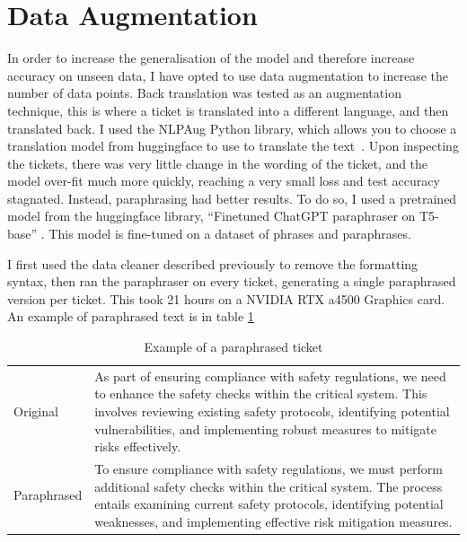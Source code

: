 \documentclass{UoYCSproject}
\begin{document}
    \section{Data Augmentation}\label{sec:data-augmentation}
    In order to increase the generalisation of the model and therefore increase accuracy on unseen data, I have opted to use data augmentation to increase the number of data points.
    Back translation was tested as an augmentation technique, this is where a ticket is translated into a different language, and then translated back.
    I used the NLPAug Python library, which allows you to choose a translation model from huggingface to use to translate the text~\cite{ma2019nlpaug}.
    Upon inspecting the tickets, there was very little change in the wording of the ticket, and the model over-fit much more quickly, reaching a very small loss and test accuracy stagnated.
    Instead, paraphrasing had better results.
    To do so, I used a pretrained model from the huggingface library, ``Finetuned ChatGPT paraphraser on T5-base'' \cite{chatgpt_paraphraser}.
    This model is fine-tuned on a dataset of phrases and paraphrases.


    I first used the data cleaner described previously to remove the formatting syntax, then ran the paraphraser on every ticket, generating a single paraphrased version per ticket.
    This took 21 hours on a NVIDIA RTX a4500 Graphics card. An example of paraphrased text is in table \ref{tab:paraphrased} \par
    \begin{table}
    \centering
    \begin{tabular}{p{2.5cm}p{9cm}}
    \toprule
    Original    & As part of ensuring compliance with safety regulations, we need to enhance the safety checks within the critical system.
    This involves reviewing existing safety protocols, identifying potential vulnerabilities, and implementing robust measures to mitigate risks effectively. \\\addlinespace[0.5em]
    Paraphrased & To ensure compliance with safety regulations, we must perform additional safety checks within the critical system. The process entails examining current safety protocols, identifying potential weaknesses, and implementing effective risk mitigation measures.

      \\
    \bottomrule
    \end{tabular}

    \caption{Example of a paraphrased ticket}
    \label{tab:paraphrased}
    \end{table}
\end{document}
